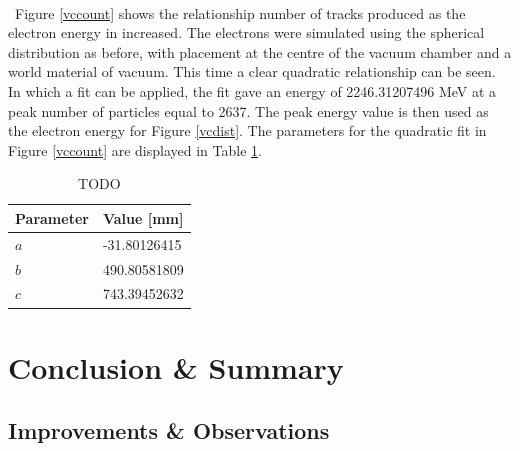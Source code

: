 \documentclass[12pt,a4paper]{article}
\begin{document}
\\\
\noindent Figure \ref{vccount} shows the relationship number of tracks produced as the electron energy in increased. The electrons were simulated using the spherical distribution as before, with placement at the centre of the vacuum chamber and a world material of vacuum. This time a clear quadratic relationship can be seen. In which a fit can be applied, the fit gave an energy of 2246.31207496 MeV at a peak number of particles equal to 2637. The peak energy value is then used as the electron energy for Figure \ref{vcdist}. The parameters for the quadratic fit in Figure \ref{vccount} are displayed in Table \ref{vctab}.
\\
\begin{table}[h!]
\centering
\begin{tabular}{|l|l|}
\hline
Parameter & Value [mm] \\ \hline
$a$ &  -31.80126415\\ \hline
$b$ &  490.80581809\\ \hline
$c$ &  743.39452632\\ \hline
\end{tabular}
\caption{TODO}
\label{vctab}
\end{table}

\section{Conclusion \& Summary}
\label{conc}

\subsection{Improvements \& Observations}
\end{document}
